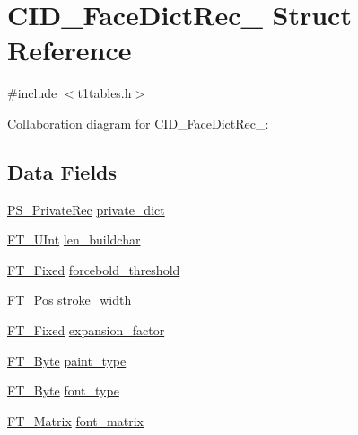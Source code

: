 \hypertarget{struct_c_i_d___face_dict_rec__}{}\section{C\+I\+D\+\_\+\+Face\+Dict\+Rec\+\_\+ Struct Reference}
\label{struct_c_i_d___face_dict_rec__}


{\ttfamily \#include $<$t1tables.\+h$>$}



Collaboration diagram for C\+I\+D\+\_\+\+Face\+Dict\+Rec\+\_\+\+:
\subsection*{Data Fields}
\begin{DoxyCompactItemize}
\item 
\hyperlink{t1tables_8h_afe2ae1e8e05fe5f125ec128d7179a462}{P\+S\+\_\+\+Private\+Rec} \hyperlink{struct_c_i_d___face_dict_rec___a6ccc25ba0592648bbb7a4a163fc7fdb0}{private\+\_\+dict}
\item 
\hyperlink{fttypes_8h_abcb8db4dbf35d2b55a9e8c7b0926dc52}{F\+T\+\_\+\+U\+Int} \hyperlink{struct_c_i_d___face_dict_rec___aec468e2ef1159dd49d33ff3560e8d15b}{len\+\_\+buildchar}
\item 
\hyperlink{fttypes_8h_a5f5a679cc09f758efdd0d1c5feed3c3d}{F\+T\+\_\+\+Fixed} \hyperlink{struct_c_i_d___face_dict_rec___a4db0975dbd1211cb43f4dfc36061b3cb}{forcebold\+\_\+threshold}
\item 
\hyperlink{ftimage_8h_af5f230f4b253d4c7715fd2e595614c90}{F\+T\+\_\+\+Pos} \hyperlink{struct_c_i_d___face_dict_rec___a7da1ebfa4a184b696f789c27c07f23d1}{stroke\+\_\+width}
\item 
\hyperlink{fttypes_8h_a5f5a679cc09f758efdd0d1c5feed3c3d}{F\+T\+\_\+\+Fixed} \hyperlink{struct_c_i_d___face_dict_rec___ae601bb5bc25e9a5f3da8e7c12fef6c92}{expansion\+\_\+factor}
\item 
\hyperlink{fttypes_8h_a51f26183ca0c9f4af958939648caeccd}{F\+T\+\_\+\+Byte} \hyperlink{struct_c_i_d___face_dict_rec___a77e70cc8a5eba8e6a0f6a3a3e2e8d50c}{paint\+\_\+type}
\item 
\hyperlink{fttypes_8h_a51f26183ca0c9f4af958939648caeccd}{F\+T\+\_\+\+Byte} \hyperlink{struct_c_i_d___face_dict_rec___af26e3e5ca3d912c2512e85257b635837}{font\+\_\+type}
\item 
\hyperlink{fttypes_8h_afeacbc4365cf2ad77162b6292f3e3e23}{F\+T\+\_\+\+Matrix} \hyperlink{struct_c_i_d___face_dict_rec___aa418f6ce40b7574b6234e0ab48377e4b}{font\+\_\+matrix}

\end{DoxyCompactItemize}
